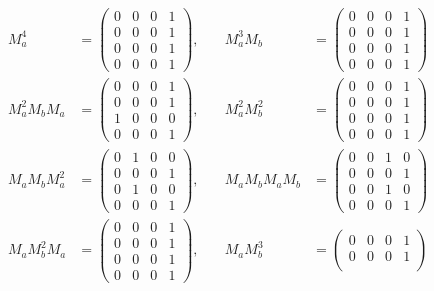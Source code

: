 \begin{ex}
\begin{sol}
\begin{enumerate}
\begin{align*}
M_a^4 &=
\begin{pmatrix}
    0 & 0 & 0 & 1 \\
    0 & 0 & 0 & 1 \\
    0 & 0 & 0 & 1 \\
    0 & 0 & 0 & 1
\end{pmatrix}, \quad
&M_a^3 M_b &=
\begin{pmatrix}
    0 & 0 & 0 & 1 \\
    0 & 0 & 0 & 1 \\
    0 & 0 & 0 & 1 \\
    0 & 0 & 0 & 1
\end{pmatrix} \\[10pt]
M_a^2 M_b M_a &=
\begin{pmatrix}
    0 & 0 & 0 & 1 \\
    0 & 0 & 0 & 1 \\
    1 & 0 & 0 & 0 \\
    0 & 0 & 0 & 1
\end{pmatrix}, \quad
&M_a^2 M_b^2 &=
\begin{pmatrix}
    0 & 0 & 0 & 1 \\
    0 & 0 & 0 & 1 \\
    0 & 0 & 0 & 1 \\
    0 & 0 & 0 & 1
\end{pmatrix} \\[10pt]
M_a M_b M_a^2 &=
\begin{pmatrix}
    0 & 1 & 0 & 0 \\
    0 & 0 & 0 & 1 \\
    0 & 1 & 0 & 0 \\
    0 & 0 & 0 & 1
\end{pmatrix}, \quad
&M_a M_b M_a M_b &=
\begin{pmatrix}
    0 & 0 & 1 & 0 \\
    0 & 0 & 0 & 1 \\
    0 & 0 & 1 & 0 \\
    0 & 0 & 0 & 1
\end{pmatrix} \\[10pt]
M_a M_b^2 M_a &=
\begin{pmatrix}
    0 & 0 & 0 & 1 \\
    0 & 0 & 0 & 1 \\
    0 & 0 & 0 & 1 \\
    0 & 0 & 0 & 1
\end{pmatrix}, \quad
&M_a M_b^3 &=
\begin{pmatrix}
    0 & 0 & 0 & 1 \\
    0 & 0 & 0 & 1 \\

\end{pmatrix}
\end{align*}
\end{enumerate}
\end{sol}
\end{ex}
